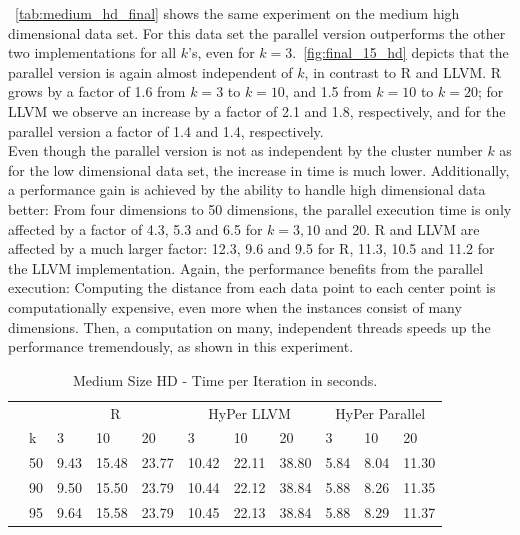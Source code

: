 ~\autoref{tab:medium_hd_final} shows the same experiment on the medium high dimensional data set. For this data set the parallel version outperforms the other two implementations for all $k$'s, even for $k = 3$.~\autoref{fig:final_15_hd} depicts that the parallel version is again almost independent of $k$, in contrast to R and LLVM. R grows by a factor of 1.6 from $k = 3$ to $k = 10$, and 1.5 from $k = 10$ to $k = 20$; for LLVM we observe an increase by a factor of 2.1 and 1.8, respectively, and for the parallel version a factor of 1.4 and 1.4, respectively. 
\\
Even though the parallel version is not as independent by the cluster number $k$ as for the low dimensional data set, the increase in time is much lower. Additionally, a performance gain is achieved by the ability to handle high dimensional data better: From four dimensions to 50 dimensions, the parallel execution time is only affected by a factor of 4.3, 5.3 and 6.5 for $k = 3, 10$ and 20. R and LLVM are affected by a much larger factor: 12.3, 9.6 and 9.5 for R, 11.3, 10.5 and 11.2 for the LLVM implementation. Again, the performance benefits from the parallel execution: Computing the distance from each data point to each center point is computationally expensive, even more when the instances consist of many dimensions. Then, a computation on many, independent threads speeds up the performance tremendously, as shown in this experiment. 

\begin{table}[htsb]
  \caption[Medium Size HD - Time per Iteration]{Medium Size HD - Time per Iteration in seconds.}
  \label{tab:medium_hd_final}
  \centering
  \begin{tabular}{l l l ll |l l l |l l l }
    \toprule
      && \multicolumn{3}{c}{R} & \multicolumn{3}{c}{HyPer LLVM} & \multicolumn{3}{c}{HyPer Parallel}  \\
      &k & 3 & 10 & 20 & 3 & 10 & 20 & 3 & 10 & 20 \\
    \midrule
      \parbox[t]{2mm}{} &50  & 9.43 & 15.48 & 23.77 & 10.42 & 22.11 & 38.80 & 5.84 & 8.04 & 11.30 \\
      &90  & 9.50 & 15.50 & 23.79 & 10.44 & 22.12 & 38.84 & 5.88 & 8.26 & 11.35 \\
      &95  & 9.64 & 15.58 & 23.79 & 10.45 & 22.13 & 38.84 & 5.88 & 8.29 & 11.37 \\
    \bottomrule
  \end{tabular}
\end{table}



